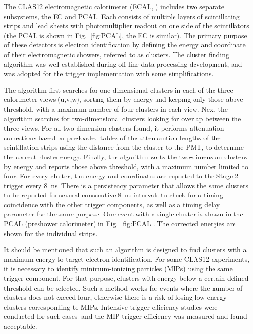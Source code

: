The CLAS12 electromagnetic calorimeter (ECAL, \cite{ec-ref}) includes two separate subsystems, the EC and PCAL. Each consists of multiple layers of scintillating strips and lead sheets with photomultiplier readout on one side of the scintillators (the PCAL is shown in Fig.~\ref{fig:PCAL}, the EC is similar). The primary purpose of these detectors is electron identification by defining the energy and coordinate of their electromagnetic showers, referred to as clusters. The cluster finding algorithm was well established during off-line data processing development, and was adopted for the trigger implementation with some simplifications.

The algorithm first searches for one-dimensional clusters in each of the three calorimeter views (u,v,w), sorting them by energy and keeping only those above threshold, with a maximum number of four clusters in each view. Next the algorithm searches for two-dimensional clusters looking for overlap between the three views. For all two-dimension clusters found, it performs attenuation corrections based on pre-loaded tables of the attenuantion lengths of the scintillation strips using the distance from the cluster to the PMT, to deternime the correct cluster energy. Finally, the algorithm sorts the two-dimension clusters by energy and reports those above threshold, with a maximum number limited to four. For every cluster, the energy and coordinates are reported to the Stage 2 trigger every 8~ns. There is a persistency parameter that allows the same clusters to be reported for several consecutive 8~ns intervals to check for a timing coincidence with the other trigger components, as well as a timing delay parameter for the same purpose. One event with a single cluster is shown in the PCAL (preshower calorimeter) in Fig.~\ref{fig:PCAL}. The corrected energies are shown for the individual strips.

It should be mentioned that such an algorithm is designed to find clusters with a maximum energy to target electron identification. For some CLAS12 experiments, it is necessary to identify minimum-ionizing particles (MIPs) using the same trigger component. For that purpose, clusters with energy below a certain defined threshold can be selected. Such a method works for events where the number of clusters does not exceed four, otherwise there is a risk of losing low-energy clusters corresponding to MIPs. Intensive trigger efficiency studies were conducted for such cases, and the MIP trigger efficiency was measured and found acceptable.

